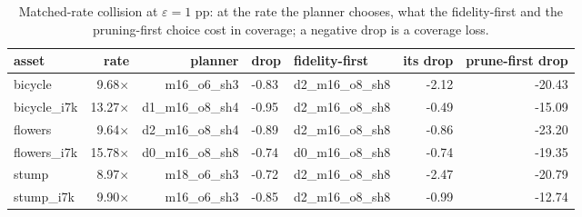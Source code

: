 \begin{table}[t]
\centering
\small
\footnotesize
\setlength{\tabcolsep}{2.8pt}
\caption{Matched-rate collision at $\varepsilon = 1$ pp: at the rate the planner chooses, what the fidelity-first and the pruning-first choice cost in coverage; a negative drop is a coverage loss.}
\label{tab:collision}
\begin{tabular}{lrrllrr}
\toprule
asset & rate & planner & drop & fidelity-first & its drop & prune-first drop \\
\midrule
bicycle & 9.68$\times$ & m16\_o6\_sh3 & -0.83 & d2\_m16\_o8\_sh8 & -2.12 & -20.43 \\
bicycle\_i7k & 13.27$\times$ & d1\_m16\_o8\_sh4 & -0.95 & d2\_m16\_o8\_sh8 & -0.49 & -15.09 \\
flowers & 9.64$\times$ & d2\_m16\_o8\_sh4 & -0.89 & d2\_m16\_o8\_sh8 & -0.86 & -23.20 \\
flowers\_i7k & 15.78$\times$ & d0\_m16\_o8\_sh8 & -0.74 & d0\_m16\_o8\_sh8 & -0.74 & -19.35 \\
stump & 8.97$\times$ & m18\_o6\_sh3 & -0.72 & d2\_m16\_o8\_sh8 & -2.47 & -20.79 \\
stump\_i7k & 9.90$\times$ & m16\_o6\_sh3 & -0.85 & d2\_m16\_o8\_sh8 & -0.99 & -12.74 \\
\bottomrule
\end{tabular}
\end{table}

